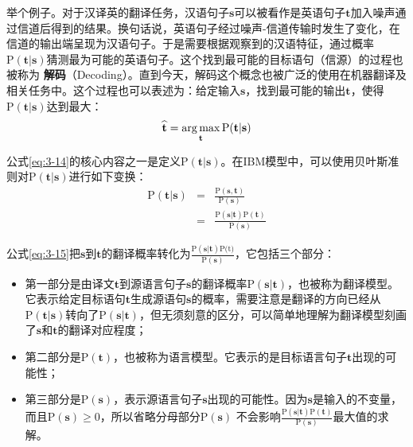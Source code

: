 \parinterval 举个例子。对于汉译英的翻译任务，汉语句子$\mathbf{s}$可以被看作是英语句子$\mathbf{t}$加入噪声通过信道后得到的结果。换句话说，英语句子经过噪声-信道传输时发生了变化，在信道的输出端呈现为汉语句子。于是需要根据观察到的汉语特征，通过概率$\textrm{P}(\mathbf{t}|\mathbf{s})$猜测最为可能的英语句子。这个找到最可能的目标语句（信源）的过程也被称为
{\small\sffamily\bfseries{解码}}（Decoding）。直到今天，解码这个概念也被广泛的使用在机器翻译及相关任务中。这个过程也可以表述为：给定输入$\mathbf{s}$，找到最可能的输出$\mathbf{t}$，使得$\textrm{P}(\mathbf{t}|\mathbf{s})$达到最大：
\begin{eqnarray}
\widehat{\mathbf{t}}=\operatorname*{arg\,max}_{\mathbf{t}}\textrm{P}(\mathbf{t}|\mathbf{s})
\label{eq:3-14}
\end{eqnarray}

\parinterval 公式\ref{eq:3-14}的核心内容之一是定义$\textrm{P}(\mathbf{t}|\mathbf{s})$。在IBM模型中，可以使用贝叶斯准则对$\textrm{P}(\mathbf{t}|\mathbf{s})$进行如下变换：
\begin{eqnarray}
\textrm{P}(\mathbf{t}|\mathbf{s}) & = &\frac{\textrm{P}(\mathbf{s},\mathbf{t})}{\textrm{P}(\mathbf{s})} \nonumber \\
                       & = & \frac{\textrm{P}(\mathbf{s}|\mathbf{t})\textrm{P}(\mathbf{t})}{\textrm{P}(\mathbf{s})}
\label{eq:3-15}
\end{eqnarray}

\parinterval 公式\ref{eq:3-15}把$\mathbf{s}$到$\mathbf{t}$的翻译概率转化为$\frac{\textrm{P}(\mathbf{s}|\mathbf{t})\textrm{P(t)}}{\textrm{P}(\mathbf{s})}$，它包括三个部分：

\begin{itemize}
\vspace{0.5em}
\item 第一部分是由译文$\mathbf{t}$到源语言句子$\mathbf{s}$的翻译概率$\textrm{P}(\mathbf{s}|\mathbf{t})$，也被称为翻译模型。它表示给定目标语句$\mathbf{t}$生成源语句$\mathbf{s}$的概率，需要注意是翻译的方向已经从$\textrm{P}(\mathbf{t}|\mathbf{s})$转向了$\textrm{P}(\mathbf{s}|\mathbf{t})$，但无须刻意的区分，可以简单地理解为翻译模型刻画了$\mathbf{s}$和$\mathbf{t}$的翻译对应程度；
\vspace{0.5em}
\item 第二部分是$\textrm{P}(\mathbf{t})$，也被称为语言模型。它表示的是目标语言句子$\mathbf{t}$出现的可能性；
\vspace{0.5em}
\item 第三部分是$\textrm{P}(\mathbf{s})$，表示源语言句子$\mathbf{s}$出现的可能性。因为$\mathbf{s}$是输入的不变量，而且$\textrm{P}(\mathbf{s}) \ge 0$，所以省略分母部分$\textrm{P}(\mathbf{s})$ 不会影响$\frac{\textrm{P}(\mathbf{s}|\mathbf{t})\textrm{P}(\mathbf{t})}{\textrm{P}(\mathbf{s})}$最大值的求解。
\vspace{0.5em}
\end{itemize}

